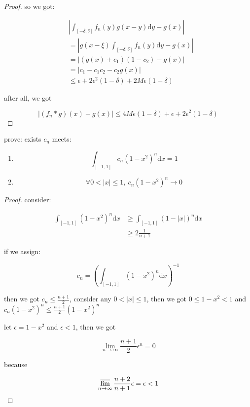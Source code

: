 \begin{proof}
    so we got:

    \begin{align*}
        & \left| \int_{[-\delta,\delta]}f_n(y)g(x-y) \mathrm{d}y - g(x)\right| \\
        &= \left| g(x-\xi)\int_{[-\delta, \delta]}f_n(y)\mathrm{d}y - g(x) \right| \\
        &= \left| (g(x) + c_1)(1-c_2) - g(x) \right| \\
        &= \left| c_1 - c_1c_2 - c_2g(x) \right| \\
        & \le \epsilon + 2\epsilon^2(1-\delta) + 2M\epsilon(1-\delta)
    \end{align*}


    after all, we got

    \[
\left| (f_n \ast g)(x) - g(x) \right| \le 4M\epsilon(1-\delta) + \epsilon + 2\epsilon^2(1-\delta)
    \]

\end{proof}

\begin{exercise}
    prove: exists $c_n$ meets:

    \begin{enumerate}
        \item

        \[
            \int_{[-1,1]}c_n(1-x^2)^n \mathrm{d}x = 1
        \]

        \item  
        
        \[
            \forall 0 < |x| \le 1, \: c_n(1-x^2)^n \to 0
        \]

    \end{enumerate}
\end{exercise}

\begin{proof}
    consider:

    \begin{align*}
        \int_{[-1,1]}(1-x^2)^n\mathrm{d}x &\ge \int_{[-1,1]}(1-|x|)^n\mathrm{d}x \\
        & \ge 2 \frac{1}{n+1}
    \end{align*}

    if we assign:


    \[
        c_n = \left(\int_{[-1,1]}(1-x^2)^n\mathrm{d}x \right)^{-1}
    \]

    then we got $c_n \le \frac{n+1}{2}$, consider any $0 < |x| \le 1$, then we got $0 \le 1-x^2 < 1$ and
    $c_n(1-x^2)^n \le \frac{n+1}{2}(1-x^2)^n$

    let $\epsilon = 1-x^2$ and $\epsilon < 1$, then we got

    \[
        \lim_{n \to \infty}\frac{n+1}{2}\epsilon ^n = 0
    \]

    because

    \[
        \varlimsup_{n \to \infty}\frac{n+2}{n+1}\epsilon = \epsilon < 1
    \]
\end{proof}

